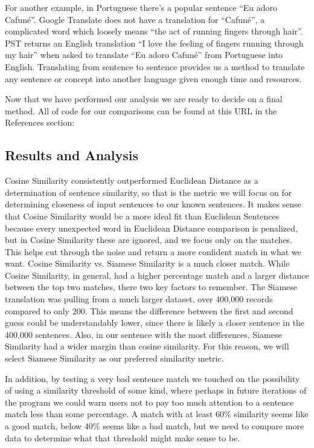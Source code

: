 \documentclass[runningheads]{llncs}
\begin{document}
	For another example, in Portuguese there's a popular sentence ``Eu adoro Cafuné''. Google Translate does not have a translation for ``Cafuné'', a complicated word which loosely means ``the act of running fingers through hair''. PST returns an English translation ``I love the feeling of fingers running through my hair'' when asked to translate ``Eu adoro Cafuné'' from Portuguese into English. Translating from sentence to sentence provides us a method to translate any sentence or concept into another language given enough time and resources.

	Now that we have performed our analysis we are ready to decide on a final method. All of code for our comparisons can be found at this URL in the References section: ~\cite{ref_url20}
	
	\subsection{Results and Analysis}
	Cosine Similarity consistently outperformed Euclidean Distance as a determination of sentence similarity, so that is the metric we will focus on for determining closeness of input sentences to our known sentences. It makes sense that Cosine Similarity would be a more ideal fit than Euclidean Sentences because every unexpected word in Euclidean Distance comparison is penalized, but in Cosine Similarity these are ignored, and we focus only on the matches. This helps cut through the noise and return a more confident match in what we want. 
	Cosine Similarity vs. Siamese Similarity is a much closer match. While Cosine Similarity, in general, had a higher percentage match and a larger distance between the top two matches, there two key factors to remember. The Siamese translation was pulling from a much larger dataset, over 400,000 records compared to only 200. This means the difference between the first and second guess could be understandably lower, since there is likely a closer sentence in the 400,000 sentences. Also, in our sentence with the most differences, Siamese Similarity had a wider margin than cosine similarity. For this reason, we will select Siamese Similarity as our preferred similarity metric.

	In addition, by testing a very bad sentence match we touched on the possibility of using a similarity threshold of some kind, where perhaps in future iterations of the program we could warn users not to pay too much attention to a sentence match less than some percentage. A match with at least 60\% similarity seems like a good match, below 40\% seems like a bad match, but we need to compare more data to determine what that threshold might make sense to be.
\end{document}
